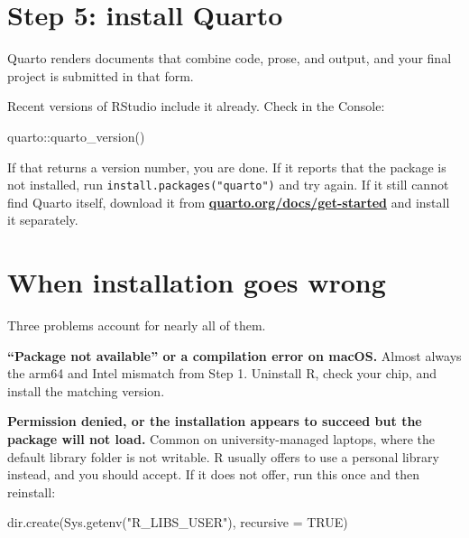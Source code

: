 \documentclass[
  a4paper,
]{scrbook}
\newenvironment{Shaded}{\begin{snugshade}}{\end{snugshade}}
\newcommand{\AttributeTok}[1]{\textcolor[rgb]{0.40,0.45,0.13}{#1}}
\newcommand{\ConstantTok}[1]{\textcolor[rgb]{0.56,0.35,0.01}{#1}}
\newcommand{\FunctionTok}[1]{\textcolor[rgb]{0.28,0.35,0.67}{#1}}
\newcommand{\NormalTok}[1]{\textcolor[rgb]{0.00,0.23,0.31}{#1}}
\newcommand{\SpecialCharTok}[1]{\textcolor[rgb]{0.37,0.37,0.37}{#1}}
\newcommand{\StringTok}[1]{\textcolor[rgb]{0.13,0.47,0.30}{#1}}
\begin{document}
\section*{Step 5: install Quarto}\label{step-5-install-quarto}


Quarto renders documents that combine code, prose, and output, and your
final project is submitted in that form.

Recent versions of RStudio include it already. Check in the Console:

\begin{Shaded}
\begin{Highlighting}[]
\NormalTok{quarto}\SpecialCharTok{::}\FunctionTok{quarto\_version}\NormalTok{()}
\end{Highlighting}
\end{Shaded}

If that returns a version number, you are done. If it reports that the
package is not installed, run \texttt{install.packages("quarto")} and
try again. If it still cannot find Quarto itself, download it from
\href{https://quarto.org/docs/get-started}{\textbf{quarto.org/docs/get-started}}
and install it separately.

\section*{When installation goes
wrong}\label{when-installation-goes-wrong}


Three problems account for nearly all of them.

\textbf{``Package not available'' or a compilation error on macOS.}
Almost always the arm64 and Intel mismatch from Step 1. Uninstall R,
check your chip, and install the matching version.

\textbf{Permission denied, or the installation appears to succeed but
the package will not load.} Common on university-managed laptops, where
the default library folder is not writable. R usually offers to use a
personal library instead, and you should accept. If it does not offer,
run this once and then reinstall:

\begin{Shaded}
\begin{Highlighting}[]
\FunctionTok{dir.create}\NormalTok{(}\FunctionTok{Sys.getenv}\NormalTok{(}\StringTok{"R\_LIBS\_USER"}\NormalTok{), }\AttributeTok{recursive =} \ConstantTok{TRUE}\NormalTok{)}
\end{Highlighting}
\end{Shaded}
\end{document}
